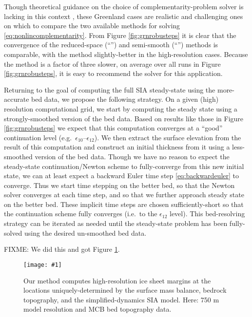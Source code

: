 \documentclass[twocolumn,letterpaper]{igs}
\newcommand{\onecol}[1]{\texttt{[image: \#1]}}
\newcommand\eps{\epsilon}
\begin{document}
Though theoretical guidance on the choice of complementarity-problem solver is lacking in this context  \citep[compare][]{BensonMunson2006}, these Greenland cases are realistic and challenging ones on which to compare the two available methods for solving \eqref{eq:nonlincomplementarity}.  From Figure \ref{fig:grnrobusteps} it is clear that the convergence of the reduced-space (``\virs'') and semi-smooth (``\viss'') methods is comparable, with the \virs method slightly-better in the high-resolution cases.  Because the \viss method is a factor of three slower, on average over all runs in Figure \ref{fig:grnrobusteps}, it is easy to recommend the \virs solver for this application.

Returning to the goal of computing the full SIA steady-state using the more-accurate \MCB bed data, we propose the following strategy.  On a given (high) resolution computational grid, we start by computing the steady state using a strongly-smoothed version of the bed data.  Based on results like those in Figure \ref{fig:grnrobusteps} we expect that this computation converges at a ``good'' continuation level (e.g.~$\eps_{10}$--$\eps_{12}$).  We then extract the surface elevation from the result of this computation and construct an initial thickness from it using a less-smoothed version of the bed data.  Though we have no reason to expect the steady-state continuation/Newton scheme to fully-converge from this new initial state, we can at least expect a backward Euler time step \eqref{eq:backwardeuler} to converge.  Thus we start time stepping on the better bed, so that the Newton solver converges at each time step, and so that we further approach steady state on the better bed.  These implicit time steps are chosen sufficiently-short so that the continuation scheme fully converges (i.e.~to the $\eps_{12}$ level).  This bed-resolving strategy can be iterated as needed until the steady-state problem has been fully-solved using the desired un-smoothed bed data.

FIXME:  We did this and got Figure \ref{fig:grnwinset}.

\begin{figure}[ht]
\onecol{grnwinset.pdf} %
\caption{Our method computes high-resolution ice sheet margins at the locations uniquely-determined by the surface mass balance, bedrock topography, and the simplified-dynamics SIA model.  Here: 750 m model resolution and MCB bed topography data.}
\label{fig:grnwinset}
\end{figure}
\end{document}
